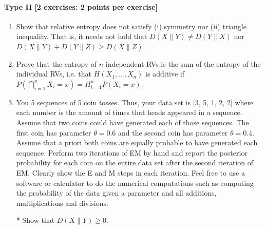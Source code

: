 \documentclass{article}
\begin{document}
\paragraph{Type II [2 exercises: 2 points per exercise]}
\begin{enumerate}
	\item Show that relative entropy does not satisfy (i) symmetry nor (ii) triangle inequality. That is, it needs not hold that $D(X\parallel Y) \neq  D(Y \parallel X)$ nor $D(X\parallel Y) + D(Y\parallel Z) \geq D(X \parallel Z)$.
	\item Prove that the entropy of $n$ independent RVs is the sum of the entropy of the individual RVs, i.e. that  $H(X_1, ..., X_n)$ is additive if $P(\bigcap_{i = 1}^{n} X_i=x) = \Pi_{i = 1}^n P(X_i=x)$.
	\item You 5 sequences of 5 coin tosses. Thus, your data set is  [3, 5, 1, 2, 2]  where each number
	is the amount of times that heads appeared in a sequence. Assume that two coins could have generated
	each of those sequences. The first coin has parameter $ \theta = 0.6 $ and the second coin has 
	parameter $ \theta = 0.4 $. Assume that a priori both coins are equally probable to have generated 
	each sequence. Perform two iterations of EM by hand and report the posterior probability for
	each coin on the entire data set after the second iteration of EM. Clearly show the E and M steps in each iteration.
	Feel free to use a software or calculator to do the numerical computations such as computing the probability
	of the data given a parameter and all additions, multiplications and divisions.
	\item[*] Show that $D(X\parallel Y) \geq 0$.

\end{enumerate}
\end{document}
